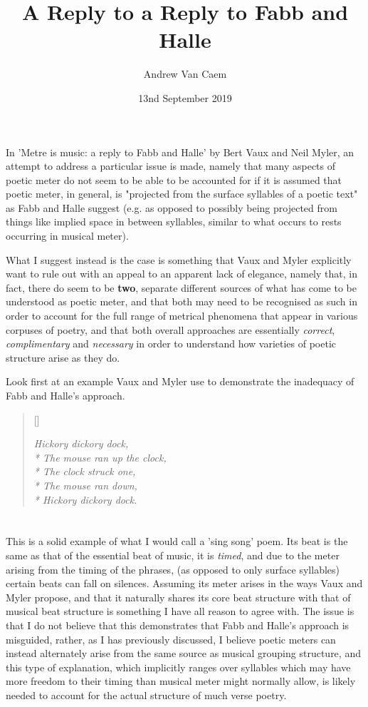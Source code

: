 \documentclass[]{article}
\title{A Reply to a Reply to Fabb and Halle}
\author{Andrew Van Caem}
\date{13nd September 2019}
\begin{document}
\newcommand{\attrib}[1]{%
\nopagebreak{\raggedleft\footnotesize #1\par}}

In 'Metre is music: a reply to Fabb and Halle' by Bert Vaux and Neil Myler, an attempt to address a particular issue is made, namely that many aspects of poetic meter do not seem to be able to be accounted for if it is assumed that poetic meter, in general, is "projected from the surface syllables of a poetic text" as Fabb and Halle suggest (e.g. as opposed to possibly being projected from things like implied space in between syllables, similar to what occurs to rests occurring in musical meter).

What I suggest instead is the case is something that Vaux and Myler explicitly want to rule out with an appeal to an apparent lack of elegance, namely that, in fact, there do seem to be \textbf{two}, separate different sources of what has come to be understood as poetic meter, and that both may need to be recognised as such in order to account for the full range of metrical phenomena that appear in various corpuses of poetry, and that both overall approaches are essentially \textit{correct}, \textit{complimentary} and \textit{necessary} in order to understand how varieties of poetic structure arise as they do.

Look first at an example Vaux and Myler use to demonstrate the inadequacy of Fabb and Halle's approach.

\renewcommand{\poemtitlefont}{\normalfont\large\itshape\centering}

\settowidth{\versewidth}{The mouse ran up the clock,}
\begin{verse}[\versewidth]

	\itshape
	Hickory dickory dock,\\*
	The mouse ran up the clock,\\*
	The clock struck one,\\*
	The mouse ran down,\\*
	Hickory dickory dock.\\
	\end{verse}
	\attrib{- Anon}
\section{}

This is a solid example of what I would call a 'sing song' poem. Its beat is the same as that of the essential beat of music, it is \textit{timed}, and due to the meter arising from the timing of the phrases, (as opposed to only surface syllables) certain beats can fall on silences. Assuming its meter arises in the ways Vaux and Myler propose, and that it naturally shares its core beat structure with that of musical beat structure is something I have all reason to agree with. The issue is that I do not believe that this demonstrates that Fabb and Halle's approach is misguided, rather, as I has previously discussed, I believe poetic meters can instead alternately arise from the same source as musical grouping structure, and this type of explanation, which implicitly ranges over syllables which may have more freedom to their timing than musical meter might normally allow, is likely needed to account for the actual structure of much verse poetry.
\end{document}
